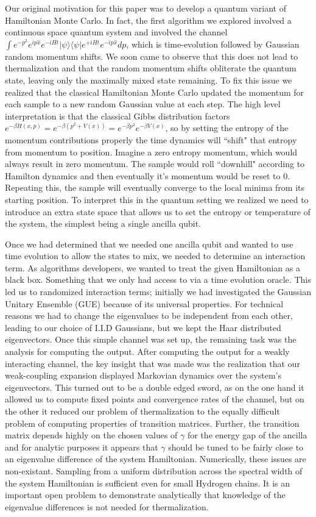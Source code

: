 \documentclass{article}
\newcommand{\ketbra}[2]{| #1\rangle\! \langle #2|}
\begin{document}
Our original motivation for this paper was to develop a quantum variant of Hamiltonian Monte Carlo. In fact, the first algorithm we explored involved a continuous space quantum system and involved the channel $\int e^{- p^2} e^{i p \hat{x}} e^{-i H t} \ketbra{\psi}{\psi} e^{+ i H t} e^{-i p \hat{x}} dp$, which is time-evolution followed by Gaussian random momentum shifts. We soon came to observe that this does not lead to thermalization and that the random momentum shifts obliterate the quantum state, leaving only the maximally mixed state remaining. To fix this issue we realized that the classical Hamiltonian Monte Carlo updated the momentum for each sample to a new random Gaussian value at each step. The high level interpretation is that the classical Gibbs distribution factors $e^{-\beta H(x, p)} = e^{-\beta (p^2 + V(x))} = e^{-\beta p^2} e^{-\beta V(x)}$, so by setting the entropy of the momentum contributions properly the time dynamics will ``shift" that entropy from momentum to position. Imagine a zero entropy momentum, which would always result in zero momentum. The sample would roll ``downhill" according to Hamilton dynamics and then eventually it's momentum would be reset to 0. Repeating this, the sample will eventually converge to the local minima from its starting position. To interpret this in the quantum setting we realized we need to introduce an extra state space that allows us to set the entropy or temperature of the system, the simplest being a single ancilla qubit.

Once we had determined that we needed one ancilla qubit and wanted to use time evolution to allow the states to mix, we needed to determine an interaction term. As algorithms developers, we wanted to treat the given Hamiltonian as a black box. Something that we only had access to via a time evolution oracle. This led us to randomized interaction terms; initially we had investigated the Gaussian Unitary Ensemble (GUE) because of its universal properties. For technical reasons we had to change the eigenvalues to be independent from each other, leading to our choice of I.I.D Gaussians, but we kept the Haar distributed eigenvectors. Once this simple channel was set up, the remaining task was the analysis for computing the output. After computing the output for a weakly interacting channel, the key insight that was made was the realization that our weak-coupling expansion displayed Markovian dynamics over the system's eigenvectors. This turned out to be a double edged sword, as on the one hand it allowed us to compute fixed points and convergence rates of the channel, but on the other it reduced our problem of thermalization to the equally difficult problem of computing properties of transition matrices. Further, the transition matrix depends highly on the chosen values of $\gamma$ for the energy gap of the ancilla and for analytic purposes it appears that $\gamma$ should be tuned to be fairly close to an eigenvalue difference of the system Hamiltonian. Numerically, these issues are non-existant. Sampling from a uniform distribution across the spectral width of the system Hamiltonian is sufficient even for small Hydrogen chains. It is an important open problem to demonstrate analytically that knowledge of the eigenvalue differences is not needed for thermalization. 
\end{document}
